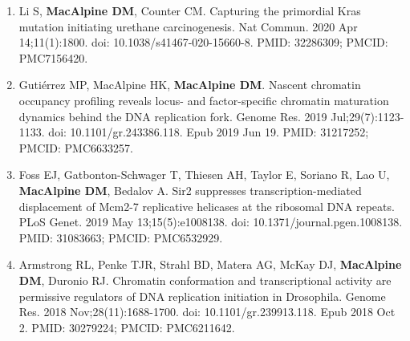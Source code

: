 \begin{enumerate}
\item Li S, {\color{dukeblue}\textbf{MacAlpine DM}}, Counter CM. Capturing the primordial Kras mutation initiating urethane carcinogenesis. Nat Commun. 2020 Apr 14;11(1):1800. doi: 10.1038/s41467-020-15660-8. PMID: 32286309; PMCID: PMC7156420.

\item Gutiérrez MP, MacAlpine HK, {\color{dukeblue}\textbf{MacAlpine DM}}. Nascent chromatin occupancy profiling reveals locus- and factor-specific chromatin maturation dynamics behind the DNA replication fork. Genome Res. 2019 Jul;29(7):1123-1133. doi: 10.1101/gr.243386.118. Epub 2019 Jun 19. PMID: 31217252; PMCID: PMC6633257.

\item Foss EJ, Gatbonton-Schwager T, Thiesen AH, Taylor E, Soriano R, Lao U, {\color{dukeblue}\textbf{MacAlpine DM}}, Bedalov A. Sir2 suppresses transcription-mediated displacement of Mcm2-7 replicative helicases at the ribosomal DNA repeats. PLoS Genet. 2019 May 13;15(5):e1008138. doi: 10.1371/journal.pgen.1008138. PMID: 31083663; PMCID: PMC6532929.

\item Armstrong RL, Penke TJR, Strahl BD, Matera AG, McKay DJ, {\color{dukeblue}\textbf{MacAlpine DM}}, Duronio RJ. Chromatin conformation and transcriptional activity are permissive regulators of DNA replication initiation in Drosophila. Genome Res. 2018 Nov;28(11):1688-1700. doi: 10.1101/gr.239913.118. Epub 2018 Oct 2. PMID: 30279224; PMCID: PMC6211642.

\end{enumerate}